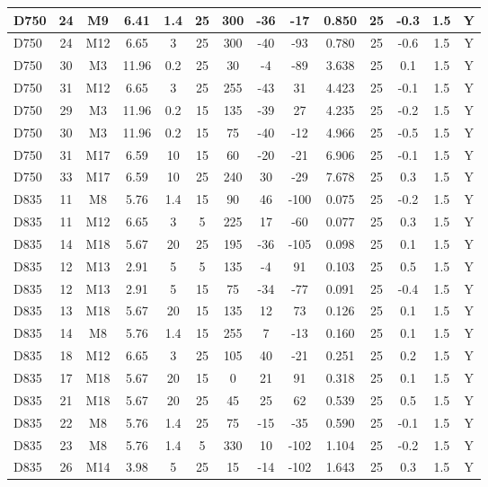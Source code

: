 \documentclass{article}
\begin{document}
\begin{center}
\begin{longtable}{|l|c|c|c|c|c|c|c|c|c|c|c|c|c|}
D750	&	24	&	M9	&	6.41	&	1.4	&	25	&	300	&	-36	&	-17	&	0.850	&	25	&	-0.3	&	1.5	&	Y	\\\hline
D750	&	24	&	M12	&	6.65	&	3	&	25	&	300	&	-40	&	-93	&	0.780	&	25	&	-0.6	&	1.5	&	Y	\\\hline
D750	&	30	&	M3	&	11.96	&	0.2	&	25	&	30	&	-4	&	-89	&	3.638	&	25	&	0.1	&	1.5	&	Y	\\\hline
D750	&	31	&	M12	&	6.65	&	3	&	25	&	255	&	-43	&	31	&	4.423	&	25	&	-0.1	&	1.5	&	Y	\\\hline
D750	&	29	&	M3	&	11.96	&	0.2	&	15	&	135	&	-39	&	27	&	4.235	&	25	&	-0.2	&	1.5	&	Y	\\\hline
D750	&	30	&	M3	&	11.96	&	0.2	&	15	&	75	&	-40	&	-12	&	4.966	&	25	&	-0.5	&	1.5	&	Y	\\\hline
D750	&	31	&	M17	&	6.59	&	10	&	15	&	60	&	-20	&	-21	&	6.906	&	25	&	-0.1	&	1.5	&	Y	\\\hline
D750	&	33	&	M17	&	6.59	&	10	&	25	&	240	&	30	&	-29	&	7.678	&	25	&	0.3	&	1.5	&	Y	\\\hline
D835	&	11	&	M8	&	5.76	&	1.4	&	15	&	90	&	46	&	-100	&	0.075	&	25	&	-0.2	&	1.5	&	Y	\\\hline
D835	&	11	&	M12	&	6.65	&	3	&	5	&	225	&	17	&	-60	&	0.077	&	25	&	0.3	&	1.5	&	Y	\\\hline
D835	&	14	&	M18	&	5.67	&	20	&	25	&	195	&	-36	&	-105	&	0.098	&	25	&	0.1	&	1.5	&	Y	\\\hline
D835	&	12	&	M13	&	2.91	&	5	&	5	&	135	&	-4	&	91	&	0.103	&	25	&	0.5	&	1.5	&	Y	\\\hline
D835	&	12	&	M13	&	2.91	&	5	&	15	&	75	&	-34	&	-77	&	0.091	&	25	&	-0.4	&	1.5	&	Y	\\\hline
D835	&	13	&	M18	&	5.67	&	20	&	15	&	135	&	12	&	73	&	0.126	&	25	&	0.1	&	1.5	&	Y	\\\hline
D835	&	14	&	M8	&	5.76	&	1.4	&	15	&	255	&	7	&	-13	&	0.160	&	25	&	0.1	&	1.5	&	Y	\\\hline
D835	&	18	&	M12	&	6.65	&	3	&	25	&	105	&	40	&	-21	&	0.251	&	25	&	0.2	&	1.5	&	Y	\\\hline
D835	&	17	&	M18	&	5.67	&	20	&	15	&	0	&	21	&	91	&	0.318	&	25	&	0.1	&	1.5	&	Y	\\\hline
D835	&	21	&	M18	&	5.67	&	20	&	25	&	45	&	25	&	62	&	0.539	&	25	&	0.5	&	1.5	&	Y	\\\hline
D835	&	22	&	M8	&	5.76	&	1.4	&	25	&	75	&	-15	&	-35	&	0.590	&	25	&	-0.1	&	1.5	&	Y	\\\hline
D835	&	23	&	M8	&	5.76	&	1.4	&	5	&	330	&	10	&	-102	&	1.104	&	25	&	-0.2	&	1.5	&	Y	\\\hline
D835	&	26	&	M14	&	3.98	&	5	&	25	&	15	&	-14	&	-102	&	1.643	&	25	&	0.3	&	1.5	&	Y	\\\hline

\end{longtable}
\end{center}
\end{document}
